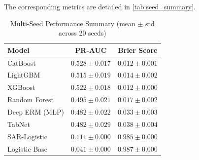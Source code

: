 

The corresponding metrics are detailed in \autoref{tab:seed_summary}.

\begin{table}[H]
\centering
\caption{Multi-Seed Performance Summary (mean $\pm$ std across 20 seeds)}
\label{tab:seed_summary}
\begin{tabular}{lcc}
\toprule
\textbf{Model} & \textbf{PR-AUC} & \textbf{Brier Score} \\
\midrule
CatBoost & $0.528 \pm 0.017$ & $0.012 \pm 0.001$ \\
LightGBM & $0.515 \pm 0.019$ & $0.014 \pm 0.002$ \\
XGBoost & $0.522 \pm 0.018$ & $0.012 \pm 0.000$ \\
Random Forest & $0.495 \pm 0.021$ & $0.017 \pm 0.002$ \\
Deep ERM (MLP) & $0.482 \pm 0.022$ & $0.033 \pm 0.003$ \\
TabNet & $0.482 \pm 0.029$ & $0.038 \pm 0.004$ \\
SAR-Logistic & $0.111 \pm 0.000$ & $0.985 \pm 0.000$ \\
Logistic Base & $0.041 \pm 0.000$ & $0.987 \pm 0.000$ \\
\bottomrule
\end{tabular}
\end{table}